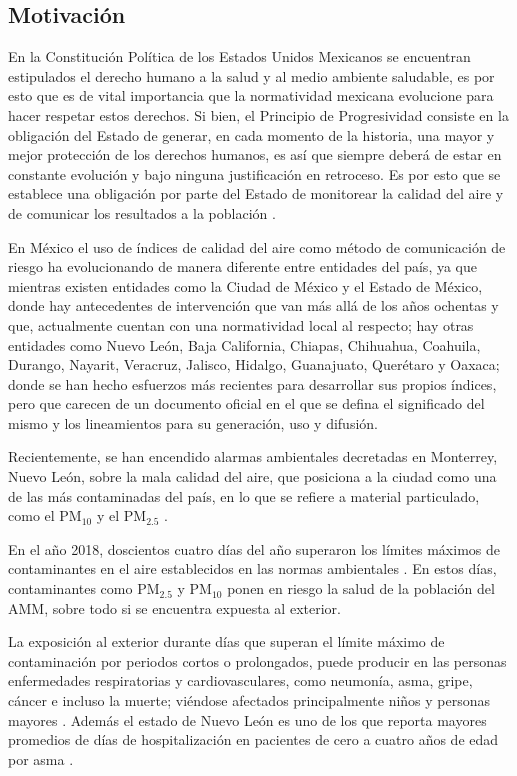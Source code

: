 \subsection{Motivación}

En la Constitución Política de los Estados Unidos Mexicanos se encuentran estipulados el derecho humano a la salud y al medio ambiente saludable, es por esto que es de vital importancia que la normatividad mexicana evolucione para hacer respetar estos derechos. Si bien, el Principio de Progresividad consiste en la obligación del Estado de generar, en cada momento de la historia, una mayor y mejor protección de los derechos humanos, es así que siempre deberá de estar en constante evolución y bajo ninguna justificación en retroceso. Es por esto que se establece una obligación por parte del Estado de monitorear la calidad del aire y de comunicar los resultados a la población \citep{gpm}.

En México el uso de índices de calidad del aire como método de comunicación de riesgo ha evolucionando de manera diferente entre entidades del país, ya que mientras existen entidades como la Ciudad de México y el Estado de México, donde hay antecedentes de intervención que van más allá de los años ochentas y que, actualmente cuentan con una normatividad local al respecto; hay otras entidades como Nuevo León, Baja California, Chiapas, Chihuahua, Coahuila, Durango, Nayarit, Veracruz, Jalisco, Hidalgo, Guanajuato, Querétaro y Oaxaca; donde se han hecho esfuerzos más recientes para desarrollar sus propios índices, pero que carecen de un documento oficial en el que se defina el significado del mismo y los lineamientos para su generación, uso y difusión.

Recientemente, se han encendido alarmas ambientales decretadas en Monterrey, Nuevo León, sobre la mala calidad del aire, que posiciona a la ciudad como una de las más contaminadas del país, en lo que se refiere a material particulado, como el PM$_{10}$ y el PM$_{2.5}$ \citep{gpm}.

En el año 2018, doscientos cuatro días del año superaron los límites máximos de contaminantes en el aire establecidos en las normas ambientales \citep{oms}. En estos días, contaminantes como PM$_{2.5}$ y PM$_{10}$ ponen en riesgo la salud de la población del AMM, sobre todo si se encuentra expuesta al exterior.

La exposición al exterior durante días que superan el límite máximo de contaminación por periodos cortos o prolongados, puede producir en las personas enfermedades respiratorias y cardiovasculares, como neumonía, asma, gripe, cáncer e incluso la muerte; viéndose afectados principalmente niños y personas mayores \citep{oms}. Además el estado de Nuevo León es uno de los que reporta mayores promedios de días de hospitalización en pacientes de cero a cuatro años de edad por asma \citep{napm}.

